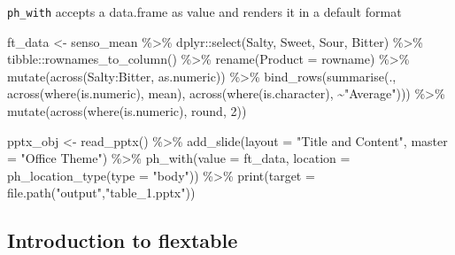 \documentclass[
]{book}
\newenvironment{Shaded}{\begin{snugshade}}{\end{snugshade}}
\newcommand{\AttributeTok}[1]{\textcolor[rgb]{0.77,0.63,0.00}{#1}}
\newcommand{\DecValTok}[1]{\textcolor[rgb]{0.00,0.00,0.81}{#1}}
\newcommand{\FunctionTok}[1]{\textcolor[rgb]{0.00,0.00,0.00}{#1}}
\newcommand{\NormalTok}[1]{#1}
\newcommand{\OtherTok}[1]{\textcolor[rgb]{0.56,0.35,0.01}{#1}}
\newcommand{\SpecialCharTok}[1]{\textcolor[rgb]{0.00,0.00,0.00}{#1}}
\newcommand{\StringTok}[1]{\textcolor[rgb]{0.31,0.60,0.02}{#1}}
\begin{document}
\texttt{ph\_with} accepts a data.frame as value and renders it in a default format

\begin{Shaded}
\begin{Highlighting}[]
\NormalTok{ft\_data }\OtherTok{\textless{}{-}}\NormalTok{ senso\_mean }\SpecialCharTok{\%\textgreater{}\%}
\NormalTok{  dplyr}\SpecialCharTok{::}\FunctionTok{select}\NormalTok{(Salty, Sweet, Sour, Bitter) }\SpecialCharTok{\%\textgreater{}\%} 
\NormalTok{  tibble}\SpecialCharTok{::}\FunctionTok{rownames\_to\_column}\NormalTok{() }\SpecialCharTok{\%\textgreater{}\%} 
  \FunctionTok{rename}\NormalTok{(}\AttributeTok{Product =}\NormalTok{ rowname) }\SpecialCharTok{\%\textgreater{}\%} 
  \FunctionTok{mutate}\NormalTok{(}\FunctionTok{across}\NormalTok{(Salty}\SpecialCharTok{:}\NormalTok{Bitter, as.numeric)) }\SpecialCharTok{\%\textgreater{}\%} 
  \FunctionTok{bind\_rows}\NormalTok{(}\FunctionTok{summarise}\NormalTok{(.,}
                      \FunctionTok{across}\NormalTok{(}\FunctionTok{where}\NormalTok{(is.numeric), mean),}
                      \FunctionTok{across}\NormalTok{(}\FunctionTok{where}\NormalTok{(is.character), }\SpecialCharTok{\textasciitilde{}}\StringTok{"Average"}\NormalTok{))) }\SpecialCharTok{\%\textgreater{}\%} 
  \FunctionTok{mutate}\NormalTok{(}\FunctionTok{across}\NormalTok{(}\FunctionTok{where}\NormalTok{(is.numeric), round, }\DecValTok{2}\NormalTok{)) }

\NormalTok{pptx\_obj }\OtherTok{\textless{}{-}} \FunctionTok{read\_pptx}\NormalTok{() }\SpecialCharTok{\%\textgreater{}\%}
  \FunctionTok{add\_slide}\NormalTok{(}\AttributeTok{layout =} \StringTok{"Title and Content"}\NormalTok{, }\AttributeTok{master =} \StringTok{"Office Theme"}\NormalTok{) }\SpecialCharTok{\%\textgreater{}\%}
  \FunctionTok{ph\_with}\NormalTok{(}\AttributeTok{value =}\NormalTok{ ft\_data, }\AttributeTok{location =} \FunctionTok{ph\_location\_type}\NormalTok{(}\AttributeTok{type =} \StringTok{"body"}\NormalTok{)) }\SpecialCharTok{\%\textgreater{}\%}
  \FunctionTok{print}\NormalTok{(}\AttributeTok{target =} \FunctionTok{file.path}\NormalTok{(}\StringTok{"output"}\NormalTok{,}\StringTok{"table\_1.pptx"}\NormalTok{))}
\end{Highlighting}
\end{Shaded}

\hypertarget{introduction-to-flextable}{%
\subsection{Introduction to flextable}\label{introduction-to-flextable}}
\end{document}
